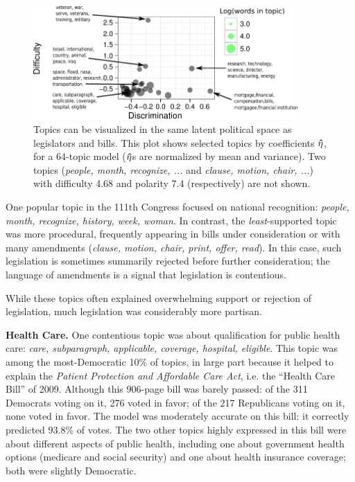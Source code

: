 \begin{figure}
  \center
  \includegraphics[width=0.9\textwidth]{chapter_spatial_voting_with_text/figures/134_64_topic_plot.pdf}
  \caption{Topics can be visualized in the same latent political space
    as legislators and bills.  This plot shows selected topics by
    coefficients $\bm \hat \eta$, for a 64-topic model ($\bm \hat \eta$s are normalized by
    mean and variance).  Two topics (\emph{people, month, recognize, ...}
    and \emph{clause, motion, chair, ...}) with difficulty 4.68 and
    polarity 7.4 (respectively) are not shown.}
  \label{fig:topics}
\end{figure}

One popular topic in the 111th Congress focused on national
recognition: \emph{people, month, recognize, history, week, woman}.
In contrast, the \emph{least}-supported topic was more procedural,
frequently appearing in bills under consideration or with many
amendments (\emph{clause, motion, chair, print, offer, read}).  In
this case, such legislation is sometimes summarily rejected before
further consideration; the language of amendments is a signal that
legislation is contentious.

While these topics often explained overwhelming support or rejection
of legislation, much legislation was considerably more partisan.

\textbf{Health Care.}  One contentious topic was about
qualification for public health care: \emph{care, subparagraph,
applicable, coverage, hospital, eligible}.  This topic was among the
most-Democratic 10\% of topics, in large part because it helped to
explain the \emph{Patient Protection and Affordable Care Act},
i.e. the ``Health Care Bill'' of 2009.  Although this 906-page bill
was barely passed: of the 311 Democrats voting on
it, 276 voted in favor; of the 217 Republicans voting on it, none
voted in favor.  The model was moderately accurate on this bill: it
correctly predicted 93.8\% of votes.  The two other topics highly
expressed in this bill were about different aspects of public health,
including one about government health options (medicare and social
security) and one about health insurance coverage; both were slightly
Democratic.

